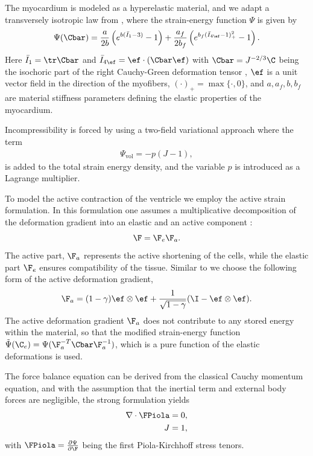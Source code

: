 The myocardium is modeled as a hyperelastic material, and we adapt a
transversely isotropic law from \cite{holzapfel2009constitutive},
where the strain-energy function $\Psi$ is given by  
\begin{align}
  \label{eq:hoa}
  \Psi(\Cbar) = \frac{a}{2 b} \left( e^{ b (\bar{I}_1  - 3)}  -1 \right)
  + \frac{a_f}{2 b_f} \left( e^{ b_f (\bar{I}_{4\ef} - 1)_+^2} -1 \right). 
\end{align}
Here $\bar{I}_1 = \tr \Cbar$ and $\bar{I}_{4\ef}= \ef \cdot (\Cbar
\ef)$ with $\Cbar = J^{-2/3}\C$ being the isochoric part of the right
Cauchy-Green deformation tensor , $\ef$ is a
unit vector field in the direction of the myofibers, $(\cdotp)_{+} 
= \max\{\cdot, 0\}$, and $a, a_f, b, b_f$ are 
material stiffness parameters defining the elastic properties of the
myocardium.

Incompressibility is forced by using a two-field variational approach
where the term
\begin{align}
\Psi_{\text{vol}} = - p (J-1), 
\end{align}
is added to the total strain energy density, and the variable $p$ is
introduced as a Lagrange multiplier.

To model the active contraction of the ventricle we employ the active
strain formulation. In this formulation one assumes a multiplicative 
decomposition of the deformation gradient into an elastic
and an active component \cite{ambrosi2011electromechanical}:
\begin{equation}
 \F = \F_e \F_a.
\label{eq:active_strain}
\end{equation}
The active part, $\F_a$ represents the active shortening of the cells,
while the elastic part $\F_e$ ensures compatibility of the tissue.
Similar to \cite{balaban2017high} we choose the following form of the active
deformation gradient,
\begin{equation}
  \F_a = (1 - \gamma) \ef \otimes \ef  + \frac{1}{\sqrt{1 - \gamma}} (\I - \ef \otimes \ef).
 \label{eq:active_strain_Fa_gjerald}
\end{equation}
The active deformation gradient $\F_a$ does not contribute to any
stored energy within the material, so that the modified
strain-energy function $\tilde{\Psi}(\C_e) = \Psi(\F_a^{-T} \Cbar
\F_a^{-1})$, which is a pure function of the elastic deformations is used.

The force balance equation can be derived from the classical Cauchy
momentum equation, and with the assumption that the inertial term and
external body forces are negligible, the strong formulation yields
\begin{align}
  \nabla \cdot \FPiola &= 0, \\
  J &= 1, 
\end{align}
with $\FPiola = \frac{\partial \Psi}{\partial \F}$ being the first
Piola-Kirchhoff stress tenors. 

